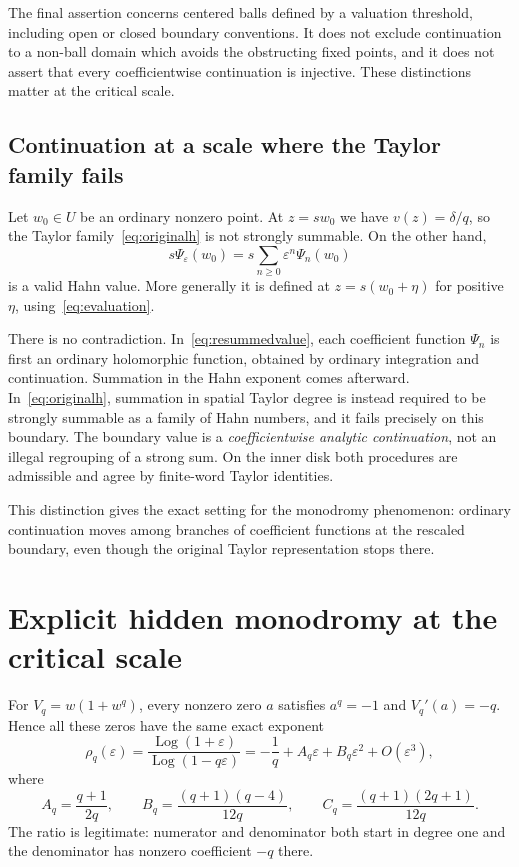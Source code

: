 \documentclass[11pt,a4paper]{article}
\numberwithin{equation}{section}
\theoremstyle{definition}
\theoremstyle{remark}
\newcommand{\eps}{\varepsilon}
\newcommand{\Log}{\operatorname{Log}}
\begin{document}
The final assertion concerns centered balls defined by a valuation
threshold, including open or closed boundary conventions.  It does not
exclude continuation to a non-ball domain which avoids the obstructing
fixed points, and it does not assert that every coefficientwise continuation
is injective.  These distinctions matter at the critical scale.

\subsection{Continuation at a scale where the Taylor family fails}

Let $w_0\in U$ be an ordinary nonzero point.  At $z=sw_0$ we have
$v(z)=\delta/q$, so the Taylor family~\eqref{eq:originalh} is not strongly
summable.  On the other hand,
\begin{equation}\label{eq:resummedvalue}
 s\Psi_\eps(w_0)=s\sum_{n\ge0}\eps^n\Psi_n(w_0)
\end{equation}
is a valid Hahn value.  More generally it is defined at $z=s(w_0+\eta)$
for positive $\eta$, using~\eqref{eq:evaluation}.

There is no contradiction.  In~\eqref{eq:resummedvalue}, each coefficient
function $\Psi_n$ is first an ordinary holomorphic function, obtained by
ordinary integration and continuation.  Summation in the Hahn exponent
comes afterward.  In~\eqref{eq:originalh}, summation in spatial Taylor degree
is instead required to be strongly summable as a family of Hahn numbers,
and it fails precisely on this boundary.
The boundary value is a \emph{coefficientwise analytic continuation}, not an
illegal regrouping of a strong sum.  On the inner disk both procedures are
admissible and agree by finite-word Taylor identities.

This distinction gives the exact setting for the monodromy phenomenon:
ordinary continuation moves among branches of coefficient functions at the
rescaled boundary, even though the original Taylor representation stops
there.

\section{Explicit hidden monodromy at the critical scale}
\label{sec:explicit}

For $V_q=w(1+w^q)$, every nonzero zero $a$ satisfies $a^q=-1$ and
$V_q'(a)=-q$.  Hence all these zeros have the same exact exponent
\begin{equation}\label{eq:rhoq}
 \rho_q(\eps)=\frac{\Log(1+\eps)}{\Log(1-q\eps)}
  =-\frac1q+A_q\eps+B_q\eps^2+O(\eps^3),
\end{equation}
where
\begin{equation}\label{eq:ABC}
 A_q=\frac{q+1}{2q},\qquad
 B_q=\frac{(q+1)(q-4)}{12q},\qquad
 C_q=\frac{(q+1)(2q+1)}{12q}.
\end{equation}
The ratio is legitimate: numerator and denominator both start in degree
one and the denominator has nonzero coefficient $-q$ there.
\end{document}
